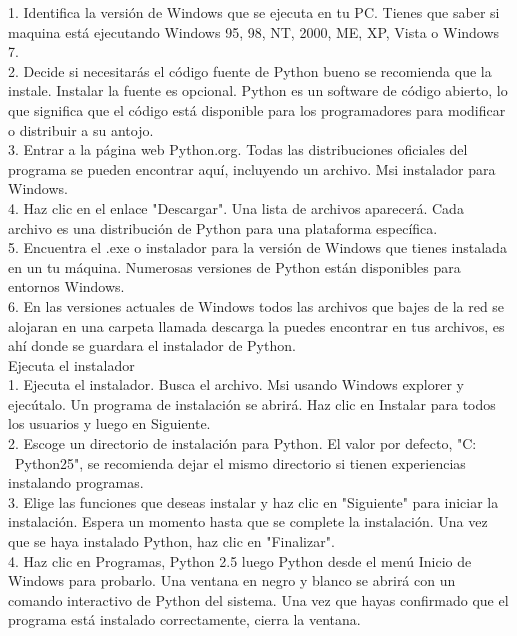 \documentclass[11pt]{article} %
\begin{document}
1.	Identifica la versión de Windows que se ejecuta en tu PC. Tienes que saber  si maquina está ejecutando Windows 95, 98, NT, 2000, ME, XP, Vista o Windows 7.\\

2.	Decide si necesitarás el código fuente de Python bueno se recomienda que la instale. Instalar la fuente es opcional. Python es un software de código abierto, lo que significa que el código está disponible para los programadores para modificar o distribuir a su antojo.\\

3.	Entrar a la página web Python.org. Todas las distribuciones oficiales del programa se pueden encontrar aquí, incluyendo un archivo. Msi instalador para Windows.\\

4.	Haz clic en el enlace "Descargar". Una lista de archivos aparecerá. Cada archivo es una distribución de Python para una plataforma específica.\\

5.	Encuentra el .exe o instalador para la versión de Windows que tienes instalada en un tu máquina.  Numerosas versiones de Python están disponibles para entornos Windows.\\


6.	En las versiones actuales de Windows todos las archivos que bajes de la red se alojaran en una carpeta llamada descarga la puedes encontrar en tus archivos, es ahí donde se guardara el instalador de Python.\\  

Ejecuta el instalador\\

1.	Ejecuta el instalador. Busca el archivo. Msi usando Windows explorer y ejecútalo. Un programa de instalación se abrirá. Haz clic en Instalar para todos los usuarios y luego en Siguiente.\\

2.	Escoge un directorio de instalación para Python. El valor por defecto, "C: \ Python25", se recomienda dejar el mismo directorio si tienen experiencias instalando programas.\\

3.	Elige las funciones que deseas instalar y haz clic en "Siguiente" para iniciar la instalación. Espera un momento hasta que se complete la instalación. Una vez que se haya instalado Python, haz clic en "Finalizar".\\

4.	Haz clic en Programas, Python 2.5 luego Python desde el menú Inicio de Windows para probarlo. Una ventana en negro y blanco se abrirá con un comando interactivo de Python del sistema. Una vez que hayas confirmado que el programa está instalado correctamente, cierra la ventana.\\
\end{document}

